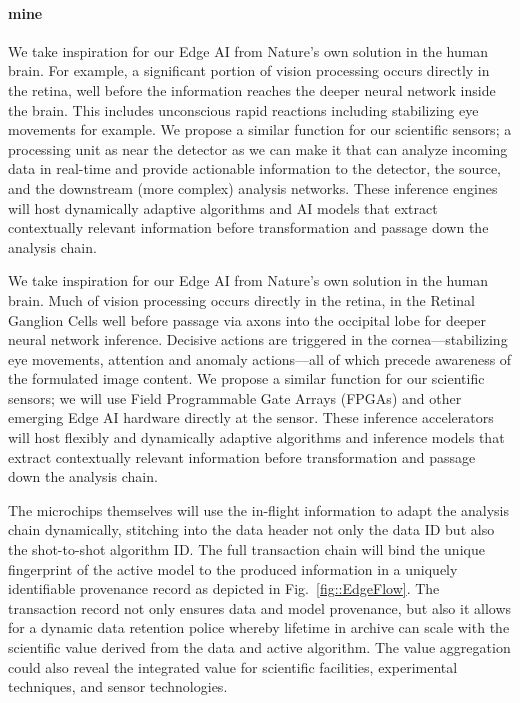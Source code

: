 \documentclass{article}
\begin{document}
\paragraph{mine}
We take inspiration for our Edge AI from Nature's own solution in the human brain.
For example, a significant portion of vision processing occurs directly in the retina, well before the information reaches the deeper neural network inside the brain.
This includes unconscious rapid reactions including stabilizing eye movements for example.
We propose a similar function for our scientific sensors; a processing unit as near the detector as we can make it that can analyze incoming data in real-time and provide actionable information to the detector, the source, and the downstream (more complex) analysis networks.
These inference engines will host dynamically adaptive algorithms and AI models that extract contextually relevant information before transformation and passage down the analysis chain.

We take inspiration for our Edge AI from Nature's own solution in the human brain.
Much of vision processing occurs directly in the retina, in the Retinal Ganglion Cells well before passage via axons into the occipital lobe for deeper neural network inference.
Decisive actions are triggered in the cornea---stabilizing eye movements, attention and anomaly actions---all of which precede awareness of the formulated image content.
We propose a similar function for our scientific sensors; we will use Field Programmable Gate Arrays (FPGAs) and other emerging Edge AI hardware \cite{edgetpu_benchmarks,edgetpu,waveCGRA,CGRAreview,seaofcores} directly at the sensor.
These inference accelerators will host flexibly and dynamically adaptive algorithms and inference models that extract contextually relevant information before transformation and passage down the analysis chain.

The microchips themselves will use the in-flight information to adapt the analysis chain dynamically, stitching into the data header not only the data ID but also the shot-to-shot algorithm ID.
The full transaction chain will bind the unique fingerprint of the active model to the produced information in a uniquely identifiable provenance record as depicted in Fig.~\ref{fig::EdgeFlow}.
The transaction record not only ensures data and model provenance, but also it allows for a dynamic data retention police whereby lifetime in archive can scale with the scientific value derived from the data and active algorithm.
The value aggregation could also reveal the integrated value for scientific facilities, experimental techniques, and sensor technologies.
\end{document}
